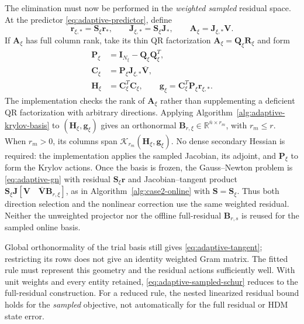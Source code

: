 \documentclass[11pt]{article}
\begin{document}
The elimination must now be performed in the \emph{weighted sampled}
residual space.  At the predictor \eqref{eq:adaptive-predictor}, define
\begin{equation}
\mathbf r_{\xi,*}=\mathbf S_\xi\mathbf r_*,\qquad
\mathbf J_{\xi,*}=\mathbf S_\xi\mathbf J_*,\qquad
\mathbf A_\xi=\mathbf J_{\xi,*}\mathbf V.
\label{eq:adaptive-weighted-operators}
\end{equation}
If $\mathbf A_\xi$ has full column rank, take its thin QR factorization
$\mathbf A_\xi=\mathbf Q_\xi\mathbf R_\xi$ and form
\begin{equation}
\begin{aligned}
\mathbf P_\xi&=\mathbf I_{N_\xi}-\mathbf Q_\xi\mathbf Q_\xi^T,\\
\mathbf C_\xi&=\mathbf P_\xi\mathbf J_{\xi,*}\overline{\mathbf V},\\
\mathbf H_\xi&=\mathbf C_\xi^T\mathbf C_\xi,\qquad
\mathbf g_\xi=\mathbf C_\xi^T\mathbf P_\xi\mathbf r_{\xi,*}.
\end{aligned}
\label{eq:adaptive-sampled-schur}
\end{equation}
The implementation checks the rank of $\mathbf A_\xi$ rather than
supplementing a deficient QR factorization with arbitrary directions.
Applying Algorithm~\ref{alg:adaptive-krylov-basis} to
$(\mathbf H_\xi,\mathbf g_\xi)$ gives an orthonormal
$\mathbf B_{r,\xi}\in\mathbb R^{\bar n\times r_m}$, with $r_m\leq r$.
When $r_m>0$, its columns span
$\mathcal K_{r_m}(\mathbf H_\xi,\mathbf g_\xi)$.
No dense secondary Hessian is required: the implementation applies the
sampled Jacobian, its adjoint, and $\mathbf P_\xi$ to form the Krylov
actions.  Once the basis is frozen, the Gauss--Newton problem is
\eqref{eq:adaptive-gn} with residual $\mathbf S_\xi\mathbf r$ and
Jacobian--tangent product
$\mathbf S_\xi\mathbf J[\mathbf V\quad
\overline{\mathbf V}\mathbf B_{r,\xi}]$, as in
Algorithm~\ref{alg:case2-online} with $\mathbf S=\mathbf S_\xi$.
Thus both direction selection and the nonlinear correction use the same
weighted residual.  Neither the unweighted projector nor the offline
full-residual $\mathbf B_{r,s}$ is reused for the sampled online basis.

Global orthonormality of the trial basis still gives
\eqref{eq:adaptive-tangent}; restricting its rows does not give an identity
weighted Gram matrix.  The fitted rule must represent this geometry and the
residual actions sufficiently well.  With unit weights and every entity
retained, \eqref{eq:adaptive-sampled-schur} reduces to the full-residual
construction.  For a reduced rule, the nested linearized residual bound
holds for the \emph{sampled} objective, not automatically for the full
residual or HDM state error.
\end{document}
